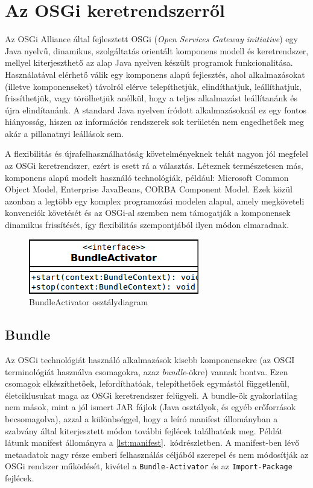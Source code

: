 \chapter{Az OSGi keretrendszerről}
\label{cha:osgi}

Az OSGi Alliance \cite{osgi} által fejlesztett OSGi (\textit{Open Services Gateway initiative}) egy Java nyelvű, dinamikus, szolgáltatás orientált komponens modell és keretrendszer, mellyel kiterjeszthető az alap Java nyelven készült programok funkcionalitása. Használatával elérhető válik egy komponens alapú fejlesztés, ahol alkalmazásokat (illetve komponenseket) távolról elérve telepíthetjük, elindíthatjuk, leállíthatjuk, frissíthetjük, vagy törölhetjük anélkül, hogy a teljes alkalmazást leállítanánk és újra elindítanánk. A standard Java nyelven íródott alkalmazásoknál ez egy fontos hiányosság, hiszen az információs rendszerek sok területén nem engedhetőek meg akár a pillanatnyi leállások sem.

A flexibilitás és újrafelhasználhatóság követelményeknek tehát nagyon jól megfelel az OSGi keretrendszer, ezért is esett rá a választás. Léteznek természetesen más, komponens alapú modelt használó technológiák, például: Microsoft Common Object Model, Enterprise JavaBeans, \mbox{CORBA} Component Model. Ezek közül azonban a legtöbb egy komplex programozási modelen alapul, amely megköveteli konvenciók követését és az OSGi-al szemben nem támogatják a komponensek dinamikus frissítését, így flexibilitás szempontjából ilyen módon elmaradnak.

\begin{figure}[htp]
\centering
\includegraphics[scale=0.6]{img/class_bundleactivator}
\caption{BundleActivator osztálydiagram}
\label{fig:class_bundleactivator}
\end{figure}

\section{Bundle}
\label{sec:bundle}

Az OSGi technológiát \cite{osgiintro}\cite{hall_challenges_2004}\cite{towardosgi} használó alkalmazások kisebb komponensekre (az OSGI terminológiát használva csomagokra, azaz \textit{bundle}-ökre) vannak bontva. Ezen csomagok elkészíthetőek, lefordíthatóak, telepíthetőek egymástól függetlenül, életciklusukat maga az OSGi keretrendszer felügyeli. A bundle-ök gyakorlatilag nem mások, mint a jól ismert JAR fájlok (Java osztályok, és egyéb erőforrások becsomagolva), azzal a különbséggel, hogy a leíró manifest állományban a szabvány által kiterjesztett módon további fejlécek találhatóak meg. Példát látunk manifest állományra a \ref{lst:manifest}.~kódrészletben. A manifest-ben lévő metaadatok nagy része emberi felhasználás céljából szerepel és nem módosítják az OSGi rendszer működését, kivétel a \texttt{Bundle-Activator} és az \texttt{Import-Package} fejlécek.

